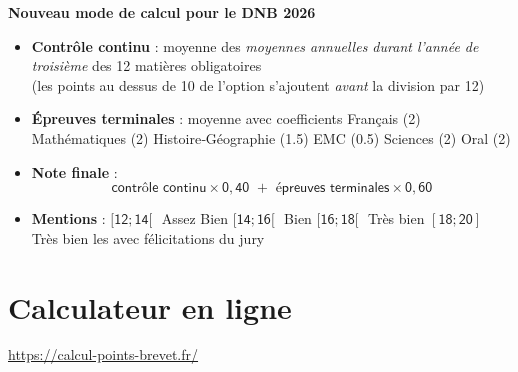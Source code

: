 \documentclass[11pt,a5paper]{article}
\begin{document}
\vspace*{2em}
\begin{tcolorbox}[colback=red!10!white, colframe=red!80!black]
\begin{center}
\Large\textbf{Nouveau mode de calcul pour le DNB 2026\footnotemark}
\end{center}
\end{tcolorbox}
\vspace{1em}
\begin{itemize}[leftmargin=1.1em,itemsep=1.2em]
\item \textbf{Contrôle continu} : moyenne des \emph{moyennes annuelles durant l’année de troisième} des 12 matières obligatoires\\
\vspace{0.2em}
(les points au dessus de 10 de l'option s’ajoutent \emph{avant} la division par 12)
\item \textbf{Épreuves terminales} : moyenne avec coefficients 
\subitem Français (2)
\subitem Mathématiques (2)
\subitem Histoire‑Géographie (1.5)
\subitem EMC (0.5)
\subitem Sciences (2)
\subitem Oral (2)
\item \textbf{Note finale} :
\vspace{-0.4em}
\[ \mathsf{\textsf{contrôle continu} \times 0,40 \,\, + \,\, \textsf{épreuves terminales} \times 0,60} \]
\item \textbf{Mentions} :
\subitem $\mathsf{[12;14[}\,\,$ Assez Bien
\subitem $\mathsf{[14; 16[}\,\,$ Bien
\subitem $\mathsf{[16; 18[}\,\,$ Très bien
\subitem $\mathsf{[18; 20]}\,\,$ Très bien les avec félicitations du jury
\end{itemize}

\section*{Calculateur en ligne}
\url{https://calcul-points-brevet.fr/}
\newpage
\end{document}
